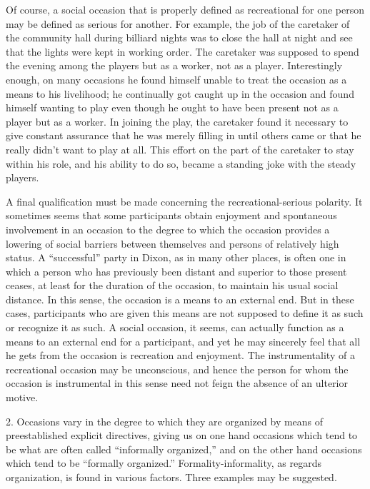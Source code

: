 \documentclass[twoside,symmetric,nobib,justified]{tufte-book}
\begin{document}
Of course, a social occasion that is properly defined as recreational
for one person may be defined as serious for another. For example, the
job of the caretaker of the community hall during billiard nights was to
close the hall at night and see that the lights were kept in working
order. The caretaker was supposed to spend the evening among the players
but as a worker, not as a player. Interestingly enough, on many
occasions he found himself unable to treat the occasion as a means to
his livelihood; he continually got caught up in the occasion and found
himself wanting to play even though he ought to have been present not as
a player but as a worker. In joining the play, the caretaker found it
necessary to give constant assurance that he was merely filling in until
others came or that he really didn't want to play at all. This effort on
the part of the caretaker to stay within his role, and his ability to do
so, became a standing joke with the steady players.

A final qualification must be made concerning the recreational-serious
polarity. It sometimes seems that some participants obtain enjoyment and
spontaneous involvement in an occasion to the degree to which the
occasion provides a lowering of social barriers between themselves and
persons of relatively high status. A ``successful'' party in Dixon, as
in many other places, is often one in which a person who has previously
been distant and superior to those present ceases, at least for the
duration of the occasion, to maintain his usual social distance. In this
sense, the occasion is a means to an external end. But in these cases,
participants who are given this means are not supposed to define it as
such or recognize it as such. A social occasion, it seems, can actually
function as a means to an external end for a participant, and yet he may
sincerely feel that all he gets from the occasion is recreation and
enjoyment. The instrumentality of a recreational occasion may be
unconscious, and hence the person for whom the occasion is instrumental
in this sense need not feign the absence of an ulterior motive.

2. Occasions vary in the degree to which they are organized by means of
preestablished explicit directives, giving us on one hand occasions
which tend to be what are often called ``informally organized,'' and on
the other hand occasions which tend to be ``formally organized.''
Formality-informality, as regards organization, is found in various
factors. Three examples may be suggested.
\end{document}
